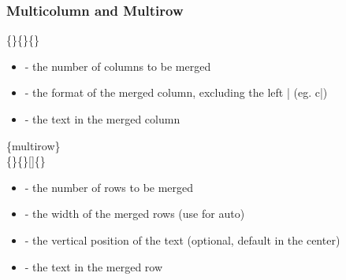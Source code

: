 \begin{frame}
	\frametitle{Multicolumn and Multirow}
	\begin{command}
		\{\}\{\}\{\}\\
		\begin{itemize}
			\item {} - the number of columns to be merged
			\item {} - the format of the merged column, excluding the left | (eg. c|)
			\item {} - the text in the merged column
		\end{itemize}
		\{multirow\}\\
		\{\}\{\}[]\{\}\\
		\begin{itemize}
			\item {} - the number of rows to be merged
			\item {} - the width of the merged rows (use \structure{*} for auto)
			\item {} - the vertical position of the text (optional, default in the center)
			\item {} - the text in the merged row
		\end{itemize}
	\end{command}
\end{frame}

